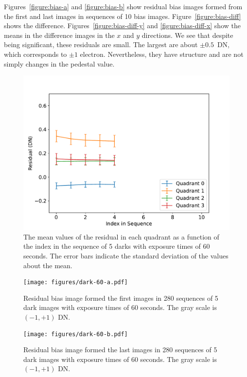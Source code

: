 \documentclass{article}
\begin{document}
Figures~\ref{figure:bias-a} and \ref{figure:bias-b} show residual bias images formed from the first and last images in sequences of 10 bias images. Figure~\ref{figure:bias-diff} shows the difference. Figures~\ref{figure:bias-diff-y} and \ref{figure:bias-diff-x} show the means in the difference images in the $x$ and $y$ directions. We see that despite being significant, these residuals are small. The largest are about $\pm0.5$~DN, which corresponds to $\pm1$ electron. Nevertheless, they have structure and are not simply changes in the pedestal value.

\begin{figure}[pb]
\begin{center}
\includegraphics[width=0.7\columnwidth]{figures/dark-60-residual-sequence.pdf}
\medskip
\caption{The mean values of the residual in each quadrant as a function of the index in the sequence of 5 darks with exposure times of 60 seconds. The error bars indicate the standard deviation of the values about the mean.}
\label{figure:dark-60-residual-sequence}
\end{center}
\end{figure}

\begin{figure}[pb]
\begin{center}
\texttt{[image: figures/dark-60-a.pdf]}
\medskip
\caption{Residual bias image formed the first images in 280 sequences of 5 dark images with exposure times of 60 seconds. The gray scale is $(-1,+1)$ DN.}
\label{figure:dark-60-a}
\end{center}
\begin{center}
\texttt{[image: figures/dark-60-b.pdf]}
\medskip
\caption{Residual bias image formed the last images in 280 sequences of 5 dark images with exposure times of 60 seconds. The gray scale is $(-1,+1)$ DN.}
\label{figure:dark-60-b}
\end{center}
\end{figure}
\end{document}
